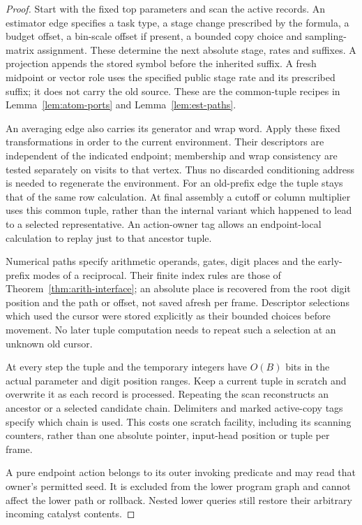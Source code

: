 \begin{proof}
Start with the fixed top parameters and scan the active records.  An
estimator edge specifies a task type, a stage change prescribed by the
formula, a budget offset, a bin-scale offset if present, a bounded copy
choice and sampling-matrix assignment.  These determine the next absolute
stage, rates and suffixes.  A projection appends the stored symbol
before the inherited suffix.  A fresh midpoint or vector role uses the
specified public stage rate and its prescribed suffix; it does not
carry the old source.  These are the common-tuple recipes in
Lemma~\ref{lem:atom-ports} and Lemma~\ref{lem:est-paths}.

An averaging edge also carries its generator and wrap word.  Apply
these fixed transformations in order to the current environment.  Their
descriptors are independent of the indicated endpoint; membership and
wrap consistency are tested separately on visits to that vertex.
Thus no discarded conditioning address is needed to regenerate the
environment.  For an old-prefix edge the tuple stays that of the same
row calculation.  At final assembly a cutoff or column multiplier uses
this common tuple, rather than the internal variant which happened to
lead to a selected representative.  An action-owner tag allows an
endpoint-local calculation to replay just to that ancestor tuple.

Numerical paths specify arithmetic operands, gates, digit places and
the early-prefix modes of a reciprocal.  Their finite index rules are
those of Theorem~\ref{thm:arith-interface}; an absolute place is recovered
from the root digit position and the path or offset, not saved afresh per frame.
Descriptor selections which used the cursor were stored explicitly as
their bounded choices before movement.  No later tuple computation
needs to repeat such a selection at an unknown old cursor.

At every step the tuple and the temporary integers have $O(B)$ bits in
the actual parameter and digit position ranges.  Keep a current tuple in scratch
and overwrite it as each record is processed.  Repeating the scan
reconstructs an ancestor or a selected candidate chain.  Delimiters and
marked active-copy tags specify which chain is used.  This costs one
scratch facility, including its scanning counters, rather than one
absolute pointer, input-head position or tuple per frame.

A pure endpoint action belongs to its outer invoking predicate and may
read that owner's permitted seed.  It is excluded from the lower program
graph and cannot affect the lower path or rollback.  Nested lower queries
still restore their arbitrary incoming catalyst contents.


\end{proof}
